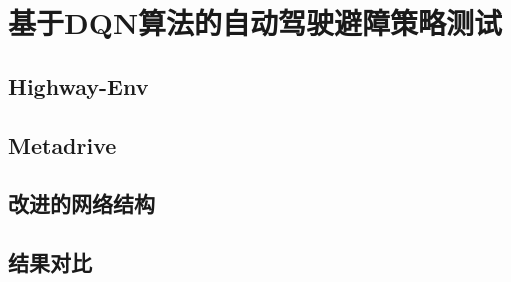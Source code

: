 %
%
%
%
%

\chapter{基于DQN算法的自动驾驶避障策略测试}

\section{Highway-Env}

\section{Metadrive}


\section{改进的网络结构}

\section{结果对比}
